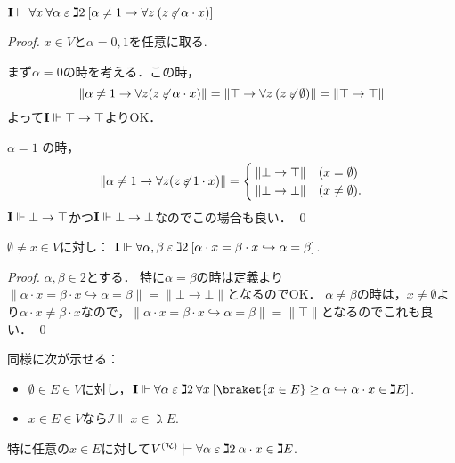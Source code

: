 \documentclass[realisability.tex]{subfiles}
\begin{document}
\begin{lemma}\label{lem:nontriv-adds-atom}
 $\mathsf{\mathbf{I}} \Vdash \forall x \: \forall \alpha \mathrel{\varepsilon} \gimel 2\: [ \alpha \neq 1 \to \forall z \: (z \not\mathrel{\varepsilon} \alpha \cdot x)]$
\end{lemma}
\begin{proof}
 $x \in V$と$\alpha = 0, 1$を任意に取る.

 まず$\alpha = 0$の時を考える．この時，
 \[
    \|\alpha \neq 1 \to \forall z (z \not\mathrel{\varepsilon} \alpha \cdot x)\|
  = \|\top \to \forall z \: (z \not\mathrel{\varepsilon} \emptyset)\|
  = \|\top \to \top\|
 \]
 よって$\mathsf{\mathbf{I}} \Vdash \top \to \top$よりOK．

 $\alpha = 1$ の時，
 \[
    \|\alpha \neq 1 \to \forall z (z \not\mathrel{\varepsilon} 1 \cdot x)\|
  =
 \begin{cases}
  \|\bot \to \top\| & (x = \emptyset)\\
  \|\bot \to \bot\| & (x \neq \emptyset).
 \end{cases}
 \]
 $\mathsf{\mathbf{I}} \Vdash \bot \to \top$かつ$\mathsf{\mathbf{I}} \Vdash \bot \to \bot$なのでこの場合も良い． \qed
\end{proof}

\begin{lemma}
 $\emptyset \neq x \in V$に対し：
 $\mathsf{\mathbf{I}} \Vdash \forall \alpha, \beta \mathrel{\varepsilon} \gimel 2 \: [\alpha \cdot x = \beta \cdot x \hookrightarrow \alpha = \beta]$.
\end{lemma}
\begin{proof}
 $\alpha, \beta \in 2$とする．
 特に$\alpha = \beta$の時は定義より$\|\alpha \cdot x = \beta \cdot x \hookrightarrow \alpha = \beta\| = \|\bot \to \bot\|$となるのでOK．
 $\alpha \neq \beta$の時は，$x \neq \emptyset$より$\alpha \cdot x \neq \beta \cdot x$なので，$\|\alpha \cdot x = \beta \cdot x \hookrightarrow \alpha = \beta\| = \|\top\|$となるのでこれも良い． \qed
\end{proof}
同様に次が示せる：
\begin{lemma}\label{lem:g2-upwd-cl}
 \begin{itemize}
  \item $\emptyset \in E \in V$に対し，$\comb{I} \Vdash \forall \alpha \strin \gimel 2 \: \forall x \:[ \braket{x \in E} \geq \alpha \hookrightarrow \alpha \cdot x \in \gimel E ]$.
  \item $x \in E \in V$なら$\mathcal{I} \Vdash x \in \gimel E$.
 \end{itemize}
 特に任意の$x \in E$に対して$V^{(\mathcal{R})} \models \forall \alpha \mathrel{\varepsilon} \gimel 2 \: \alpha \cdot x \in \gimel E$.
\end{lemma}
\end{document}
